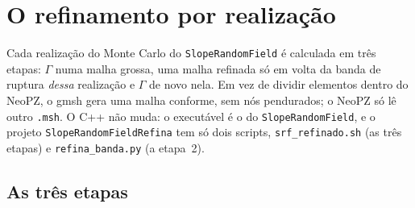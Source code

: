 \section{O refinamento por realização}\label{sec:ref:metodo}

Cada realização do Monte Carlo do \texttt{SlopeRandomField} é calculada em três etapas: $\Gamma$ numa malha grossa, uma
malha refinada só em volta da banda de ruptura \emph{dessa} realização e $\Gamma$ de novo nela. Em vez de dividir
elementos dentro do NeoPZ, o gmsh gera uma malha conforme, sem nós pendurados; o NeoPZ só lê outro \texttt{.msh}. O C++
não muda: o executável é o do \texttt{SlopeRandomField}, e o projeto \texttt{SlopeRandomFieldRefina} tem só dois
scripts, \texttt{srf\_refinado.sh} (as três etapas) e \texttt{refina\_banda.py} (a etapa~2).

\subsection{As três etapas}\label{sec:ref:etapas}

